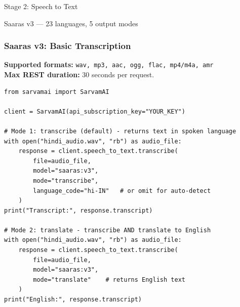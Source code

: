 \begin{frame}[fragile]\frametitle{}
\begin{center}
{\Large Stage 2: Speech to Text}

{\normalsize Saaras v3 --- 23 languages, 5 output modes}
\end{center}
\end{frame}

\begin{frame}[fragile]\frametitle{Saaras v3: Basic Transcription}
\textbf{Supported formats:} \texttt{wav, mp3, aac, ogg, flac, mp4/m4a, amr}\\
\textbf{Max REST duration:} 30 seconds per request.
\begin{lstlisting}
from sarvamai import SarvamAI

client = SarvamAI(api_subscription_key="YOUR_KEY")

# Mode 1: transcribe (default) - returns text in spoken language
with open("hindi_audio.wav", "rb") as audio_file:
    response = client.speech_to_text.transcribe(
        file=audio_file,
        model="saaras:v3",
        mode="transcribe",
        language_code="hi-IN"   # or omit for auto-detect
    )
print("Transcript:", response.transcript)

# Mode 2: translate - transcribe AND translate to English
with open("hindi_audio.wav", "rb") as audio_file:
    response = client.speech_to_text.transcribe(
        file=audio_file,
        model="saaras:v3",
        mode="translate"    # returns English text
    )
print("English:", response.transcript)
\end{lstlisting}
\end{frame}


